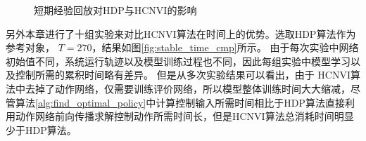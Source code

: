 \begin{figure}[htb]
\centering 
    \caption{短期经验回放对HDP与HCNVI的影响 }
    \label{fig:stable_replay_cmp}
\end{figure}

另外本章进行了十组实验来对比HCNVI算法在时间上的优势。选取HDP算法作为参考对象，
$T=270$，结果如图\ref{fig:stable_time_cmp}所示。
由于每次实验中网络初始值不同，系统运行轨迹以及模型训练过程也不同，因此每组实验中模型学习以及控制所需的累积时间略有差异。
但是从多次实验结果可以看出，由于
HCNVI算法中去掉了动作网络，仅需要训练评价网络，所以模型整体训练时间大大缩减，尽管算法\ref{alg:find_optimal_policy}中计算控制输入所需时间相比于HDP算法直接利用动作网络前向传播求解控制动作所需时间长，但是HCNVI算法总消耗时间明显少于HDP算法。

